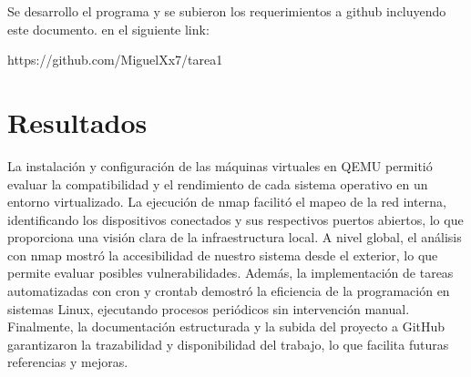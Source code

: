 \documentclass[conference]{IEEEtran}
\begin{document}
Se desarrollo el programa y se subieron los requerimientos a github incluyendo este documento.
en el siguiente link:

https://github.com/MiguelXx7/tarea1


\section{Resultados}

La instalación y configuración de las máquinas virtuales en QEMU permitió evaluar la compatibilidad y el rendimiento de cada sistema operativo en un entorno virtualizado. La ejecución de nmap facilitó el mapeo de la red interna, identificando los dispositivos conectados y sus respectivos puertos abiertos, lo que proporciona una visión clara de la infraestructura local. A nivel global, el análisis con nmap mostró la accesibilidad de nuestro sistema desde el exterior, lo que permite evaluar posibles vulnerabilidades. Además, la implementación de tareas automatizadas con cron y crontab demostró la eficiencia de la programación en sistemas Linux, ejecutando procesos periódicos sin intervención manual. Finalmente, la documentación estructurada y la subida del proyecto a GitHub garantizaron la trazabilidad y disponibilidad del trabajo, lo que facilita futuras referencias y mejoras.
\end{document}
